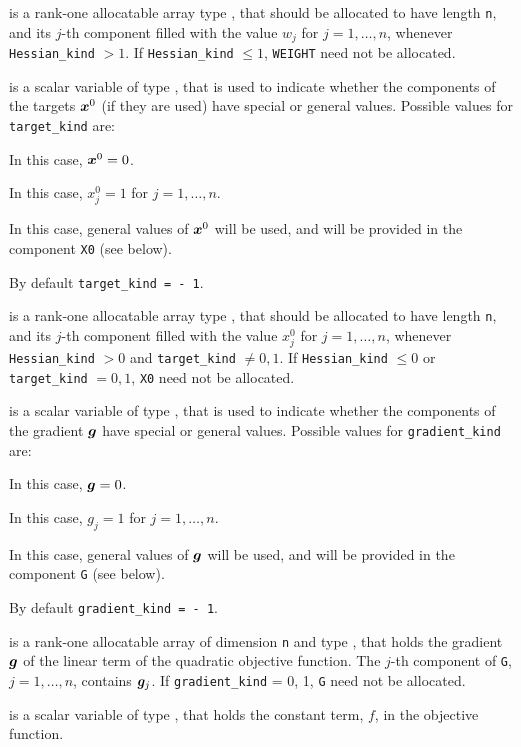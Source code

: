 \documentclass{galahad}
\begin{document}
\begin{description}
 is a rank-one allocatable array type \realdp, that 
should be allocated to have length {\tt n}, and its $j$-th component 
filled with the value $w_{j}$ for $j = 1, \ldots , n$, 
whenever {\tt Hessian\_kind} $>1$.
If {\tt Hessian\_kind} $\leq 1$, {\tt WEIGHT} need not be allocated.

 is a scalar variable of type \integer, 
that is used to indicate whether the components of the targets ${\bm{x}}^0$ 
(if they are used) have special or general values. Possible values for 
{\tt target\_kind} are:
\begin{description}
  In this case, ${\bm{x}}^0 = 0$.

 In this case, $x^0_{j} = 1$ for $j = 1, \ldots , n$.

 In this case, general values of ${\bm{x}}^0$ will be used,
     and will be provided in the component {\tt X0} (see below).
\end{description}
By default {\tt target\_kind = - 1}.

 is a rank-one allocatable array type \realdp, that 
should be allocated to have length {\tt n}, and its $j$-th component 
filled with the value $x_{j}^0$ for $j = 1, \ldots , n$, 
whenever {\tt Hessian\_kind} $>0$ and {\tt target\_kind} $\neq 0,1$.
If {\tt Hessian\_kind} $\leq 0$ or {\tt target\_kind} $= 0,1$,
{\tt X0} need not be allocated.

 is a scalar variable of type \integer, 
that is used to indicate whether the components of the gradient ${\bm{g}}$ 
have special or general values. Possible values for {\tt gradient\_kind} are:
\begin{description}
  In this case, ${\bm{g}} = 0$.

 In this case, $g_{j} = 1$ for $j = 1, \ldots , n$.

 In this case, general values of ${\bm{g}}$ will be used,
     and will be provided in the component {\tt G} (see below).
\end{description}
By default {\tt gradient\_kind = - 1}.

 is a rank-one allocatable array of dimension {\tt n} and type 
\realdp, that holds the gradient ${\bm{g}}$ 
of the linear term of the quadratic objective function.
The $j$-th component of 
{\tt G}, $j = 1,  \ldots ,  n$, contains ${\bm{g}}_{j}$.
If {\tt gradient\_kind} {= 0, 1}, {\tt G} need not be allocated.

 is a scalar variable of type \realdp, that holds 
the constant term, $f$, in the objective function.


\end{description}
\end{document}
